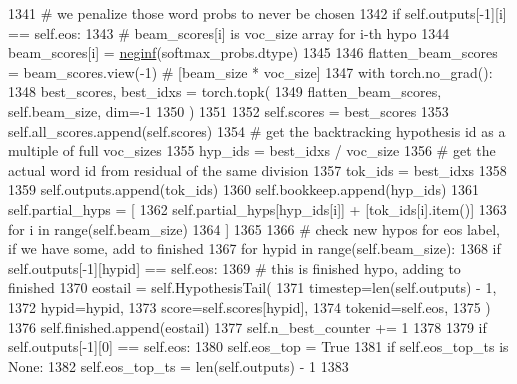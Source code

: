 \begin{DoxyCode}
1341                 \textcolor{comment}{# we penalize those word probs to never be chosen}
1342                 \textcolor{keywordflow}{if} self.outputs[-1][i] == self.eos:
1343                     \textcolor{comment}{# beam\_scores[i] is voc\_size array for i-th hypo}
1344                     beam\_scores[i] = \hyperlink{namespaceparlai_1_1utils_1_1misc_a68c44ca571de7149b683539db659c330}{neginf}(softmax\_probs.dtype)
1345 
1346         flatten\_beam\_scores = beam\_scores.view(-1)  \textcolor{comment}{# [beam\_size * voc\_size]}
1347         with torch.no\_grad():
1348             best\_scores, best\_idxs = torch.topk(
1349                 flatten\_beam\_scores, self.beam\_size, dim=-1
1350             )
1351 
1352         self.scores = best\_scores
1353         self.all\_scores.append(self.scores)
1354         \textcolor{comment}{# get the backtracking hypothesis id as a multiple of full voc\_sizes}
1355         hyp\_ids = best\_idxs / voc\_size
1356         \textcolor{comment}{# get the actual word id from residual of the same division}
1357         tok\_ids = best\_idxs %
1358 
1359         self.outputs.append(tok\_ids)
1360         self.bookkeep.append(hyp\_ids)
1361         self.partial\_hyps = [
1362             self.partial\_hyps[hyp\_ids[i]] + [tok\_ids[i].item()]
1363             \textcolor{keywordflow}{for} i \textcolor{keywordflow}{in} range(self.beam\_size)
1364         ]
1365 
1366         \textcolor{comment}{#  check new hypos for eos label, if we have some, add to finished}
1367         \textcolor{keywordflow}{for} hypid \textcolor{keywordflow}{in} range(self.beam\_size):
1368             \textcolor{keywordflow}{if} self.outputs[-1][hypid] == self.eos:
1369                 \textcolor{comment}{#  this is finished hypo, adding to finished}
1370                 eostail = self.HypothesisTail(
1371                     timestep=len(self.outputs) - 1,
1372                     hypid=hypid,
1373                     score=self.scores[hypid],
1374                     tokenid=self.eos,
1375                 )
1376                 self.finished.append(eostail)
1377                 self.n\_best\_counter += 1
1378 
1379         \textcolor{keywordflow}{if} self.outputs[-1][0] == self.eos:
1380             self.eos\_top = \textcolor{keyword}{True}
1381             \textcolor{keywordflow}{if} self.eos\_top\_ts \textcolor{keywordflow}{is} \textcolor{keywordtype}{None}:
1382                 self.eos\_top\_ts = len(self.outputs) - 1
1383 
\end{DoxyCode}
\mbox{\label{classprojects_1_1controllable__dialogue_1_1controllable__seq2seq_1_1controllable__seq2seq_1_1Beam_a80fc3ae32d64b7b1dd19944b70b3db50}} 
